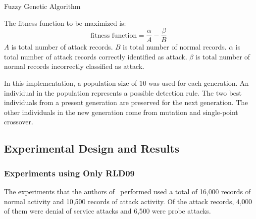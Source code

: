\documentclass{sig-alternate}
\begin{document}
\begin{algorithm}
\caption{Fuzzy Genetic Algorithm}
\label{alg:fuzGenAlg}
\begin{algorithmic}

    \ENDFOR
    
      \ELSE {}
    \ENDIF
  \ENDFOR
  
\ENDFOR
{}
\end{algorithmic}
\end{algorithm}


The fitness function to be maximized is:
\begin{equation*}
\textrm{fitness function} = \frac{\alpha}{A} - \frac{\beta}{B}
\end{equation*}
$A$ is total number of attack records. $B$ is total number of normal records. $\alpha$ is total number of attack records correctly identified as attack. $\beta$ is total number of normal records incorrectly classified as attack.

In this implementation, a population size of 10 was used for each generation. An individual in the population represents a possible detection rule. The two best individuals from a present generation are preserved for the next generation. The other individuals in the new generation come from mutation and single-point crossover.




\subsection{Experimental Design and Results}

\subsubsection{Experiments using Only RLD09}
The experiments that the authors of~\cite{6496342, 6559603} performed used a total of 16,000 records of normal activity and 10,500 records of attack activity. Of the attack records, 4,000 of them were denial of service attacks and 6,500 were probe attacks.
\end{document}

